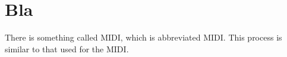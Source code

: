 \chapter{Bla}

There is something called \acrlong{MIDI}, which is abbreviated \acrshort{MIDI}. This process is similar to that used for the \acrfull{MIDI}.

\newpage
